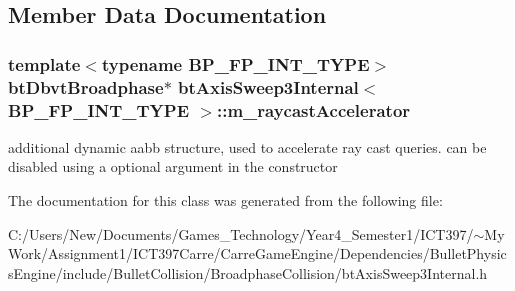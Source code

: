 \subsection{Member Data Documentation}
\hypertarget{classbt_axis_sweep3_internal_a0c964a27cd6722bdd231890b1239528}{
\subsubsection[m\_\-raycastAccelerator]{\setlength{\rightskip}{0pt plus 5cm}template$<$typename BP\_\-FP\_\-INT\_\-TYPE$>$ {\bf btDbvtBroadphase}$\ast$ {\bf btAxisSweep3Internal}$<$ BP\_\-FP\_\-INT\_\-TYPE $>$::{\bf m\_\-raycastAccelerator}}}
\label{classbt_axis_sweep3_internal_a0c964a27cd6722bdd231890b1239528}


additional dynamic aabb structure, used to accelerate ray cast queries. can be disabled using a optional argument in the constructor 

The documentation for this class was generated from the following file:\begin{CompactItemize}
\item 
C:/Users/New/Documents/Games\_\-Technology/Year4\_\-Semester1/ICT397/$\sim$My Work/Assignment1/ICT397Carre/CarreGameEngine/Dependencies/BulletPhysicsEngine/include/BulletCollision/BroadphaseCollision/btAxisSweep3Internal.h\end{CompactItemize}
